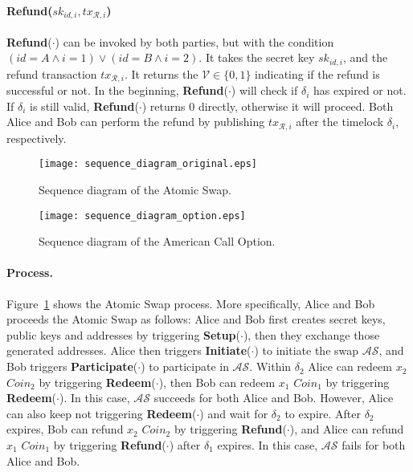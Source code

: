 \paragraph{\textbf{Refund}($sk_{id, i}, tx_{\mathcal{R}, i}$)}
\textbf{Refund}($\cdot$) can be invoked by both parties, but with the condition $(id = A \wedge i = 1) \vee (id = B \wedge i = 2)$.
It takes the secret key $sk_{id, i}$,
and the refund transaction $tx_{\mathcal{R}, i}$.
It returns the $\mathcal{V} \in \{0, 1\}$ indicating if the refund is successful or not.
In the beginning, \textbf{Refund}($\cdot$) will check if $\delta_i$ has expired or not. If $\delta_i$ is still valid, \textbf{Refund}($\cdot$) returns $0$ directly, otherwise it will proceed.
Both Alice and Bob can perform the refund by publishing $tx_{\mathcal{R}, i}$ after the timelock $\delta_i$, respectively.



\begin{figure}
    \texttt{[image: sequence\_diagram\_original.eps]}
    \caption{Sequence diagram of the Atomic Swap.}
    \label{fig:sequence_diagram_original}
\end{figure}

\begin{figure}
    \texttt{[image: sequence\_diagram\_option.eps]}
    \caption{Sequence diagram of the American Call Option.}
    \label{fig:sequence_diagram_option}
\end{figure}


\paragraph{Process.}
Figure~\ref{fig:sequence_diagram_original} shows the Atomic Swap process.
More specifically, Alice and Bob proceeds the Atomic Swap as follows:
Alice and Bob first creates secret keys, public keys and addresses by triggering \textbf{Setup}($\cdot$), then they exchange those generated addresses.
Alice then triggers \textbf{Initiate}($\cdot$) to initiate the swap $\mathcal{AS}$, and Bob triggers \textbf{Participate}($\cdot$) to participate in $\mathcal{AS}$.
Within $\delta_2$ Alice can redeem $x_2$ $Coin_2$ by triggering \textbf{Redeem}($\cdot$), then Bob can redeem $x_1$ $Coin_1$ by triggering \textbf{Redeem}($\cdot$).
In this case, $\mathcal{AS}$ succeeds for both Alice and Bob.
However, Alice can also keep not triggering \textbf{Redeem}($\cdot$) and wait for $\delta_2$ to expire.
After $\delta_2$ expires, Bob can refund $x_2$ $Coin_2$ by triggering \textbf{Refund}($\cdot$), and Alice can refund $x_1$ $Coin_1$ by triggering \textbf{Refund}($\cdot$) after $\delta_1$ expires.
In this case, $\mathcal{AS}$ fails for both Alice and Bob.

